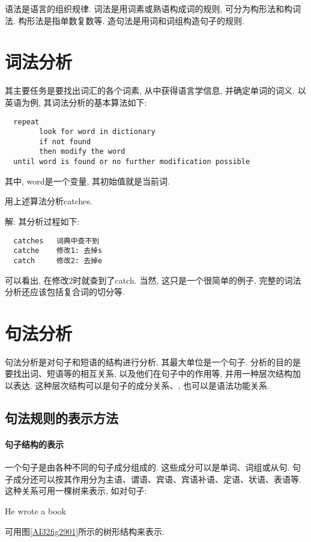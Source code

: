 语法是语言的组织规律. 词法是用词素或熟语构成词的规则, 可分为构形法和构词法. 构形法是指单数复数等. 造句法是用词和词组构造句子的规则.
\section{词法分析}
    其主要任务是要找出词汇的各个词素, 从中获得语言学信息, 并确定单词的词义. 以英语为例, 其词法分析的基本算法如下:
\begin{Verbatim}
  repeat
        look for word in dictionary
        if not found
        then modify the word
  until word is found or no further modification possible
\end{Verbatim}
其中, word是一个变量, 其初始值就是当前词.

\begin{example}
  用上述算法分析catches.
\end{example}

解: 其分析过程如下:
\begin{Verbatim}
  catches   词典中查不到
  catche    修改1: 去掉s
  catch     修改2: 去掉e
\end{Verbatim}

可以看出, 在修改2时就查到了catch. 当然, 这只是一个很简单的例子, 完整的词法分析还应该包括复合词的切分等.

\section{句法分析}
     句法分析是对句子和短语的结构进行分析, 其最大单位是一个句子. 分析的目的是要找出词、短语等的相互关系, 以及他们在句子中的作用等, 并用一种层次结构加以表达. 这种层次结构可以是句子的成分关系、, 也可以是语法功能关系.
\subsection{句法规则的表示方法}
\paragraph{句子结构的表示}
一个句子是由各种不同的句子成分组成的. 这些成分可以是单词、词组或从句. 句子成分还可以按其作用分为主语、谓语、宾语、宾语补语、定语、状语、表语等. 这种关系可用一棵树来表示, 如对句子:
\begin{center}
  He  wrote  a  book
\end{center}
可用图\ref{AI32fig2901}所示的树形结构来表示.

